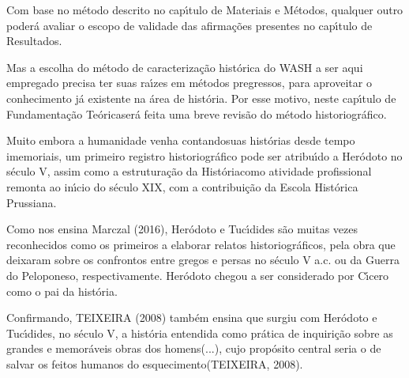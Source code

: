 \documentclass[
12pt,		%
openright,	%
twoside,  %
a4paper,			%
chapter=TITLE,		%
english,			%
french,				%
spanish,			%
brazil				%
]{USPSC-classe/USPSC}
\begin{document}
Com base no m\'etodo descrito no cap\'{\i}tulo de \textquotedbl Materiais e M\'etodos\textquotedbl , qualquer outro poder\'a avaliar o escopo de validade das afirma\c{c}\~oes presentes no cap\'{\i}tulo de \textquotedbl Resultados\textquotedbl .









Mas a escolha do m\'etodo de caracteriza\c{c}\~ao hist\'orica do WASH a ser aqui empregado precisa ter suas ra\'{\i}zes em m\'etodos pregressos, para aproveitar o conhecimento j\'a existente na \'area de hist\'oria. Por esse motivo, neste cap\'{\i}tulo de \textquotedbl Fundamenta\c{c}\~ao Te\'orica\textquotedbl  ser\'a feita uma breve revis\~ao do m\'etodo historiogr\'afico.









Muito embora a humanidade venha \textquotedbl contando\textquotedbl  suas hist\'orias desde tempo imemoriais, um primeiro registro historiogr\'afico pode ser atribu\'{\i}do a Her\'odoto no s\'eculo V, assim como a estrutura\c{c}\~ao da \textquotedbl Hist\'oria\textquotedbl  como atividade profissional remonta ao in\'{\i}cio do s\'eculo XIX, com a contribui\c{c}\~ao da Escola Hist\'orica Prussiana.









Como nos ensina  Marczal (2016),  Her\'odoto e Tuc\'{\i}dides s\~ao muitas vezes reconhecidos como os primeiros a elaborar relatos historiogr\'aficos, pela obra que deixaram sobre os confrontos entre gregos e persas no s\'eculo V a.c. ou da Guerra do Peloponeso, respectivamente. Her\'odoto chegou a ser considerado por C\'{\i}cero como o \textquotedbl pai da hist\'oria\textquotedbl .









Confirmando, TEIXEIRA (2008)  tamb\'em ensina que surgiu com Her\'odoto e Tuc\'{\i}dides, no s\'eculo V, a hist\'oria \textquotedbl entendida como pr\'atica de inquiri\c{c}\~ao sobre as grandes e memor\'aveis obras dos homens(...), cujo prop\'osito central seria o de salvar os feitos humanos do esquecimento\textquotedbl   (TEIXEIRA, 2008).
\end{document}
